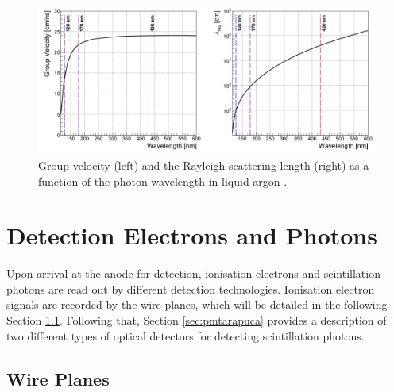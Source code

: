 \begin{figure}[ht!] 
\centering    
\includegraphics[width=1.0\textwidth]{vuv_visible}
\caption[Group Velocity and Rayleigh Scattering Length of Photons in Liquid Argon]{
Group velocity (left) and the Rayleigh scattering length (right) as a function of the photon wavelength in liquid argon \cite{PatrickPhD}.
}
\label{fig:vuv_visible}
\end{figure}

\section{Detection Electrons and Photons}

\label{sec3:detection}

Upon arrival at the anode for detection, ionisation electrons and scintillation photons are read out by different detection technologies.
Ionisation electron signals are recorded by the wire planes, which will be detailed in the following Section \ref{sec:wire}.
Following that, Section \ref{sec:pmtarapuca} provides a description of two different types of optical detectors for detecting scintillation photons.

\subsection{Wire Planes}
\label{sec:wire}

